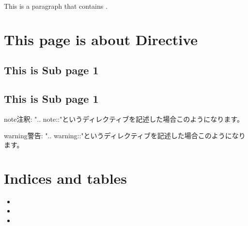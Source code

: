\documentclass[letterpaper,10pt,dvipdfmx,openany,oneside]{sphinxmanual}
\begin{document}

This is a paragraph that contains .




\chapter{This page is about Directive}
\label{\detokenize{2.chapter/directive:this-page-is-about-directive}}\label{\detokenize{2.chapter/directive::doc}}\label{\detokenize{2.chapter/directive:sphinx-sample-project}}

\section{This is Sub page 1}
\label{\detokenize{2.chapter/subpage/sub1:this-is-sub-page-1}}\label{\detokenize{2.chapter/subpage/sub1::doc}}

\section{This is Sub page 1}
\label{\detokenize{2.chapter/subpage/sub2:this-is-sub-page-1}}\label{\detokenize{2.chapter/subpage/sub2::doc}}
\begin{sphinxadmonition}{note}{注釈:}
".. note::"というディレクティブを記述した場合このようになります。
\end{sphinxadmonition}

\begin{sphinxadmonition}{warning}{警告:}
".. warning::"というディレクティブを記述した場合このようになります。
\end{sphinxadmonition}


\chapter{Indices and tables}
\label{\detokenize{index:indices-and-tables}}\begin{itemize}
\item {} 

\item {} 

\item {} 

\end{itemize}



\renewcommand{\indexname}{索引}
\printindex
\end{document}
